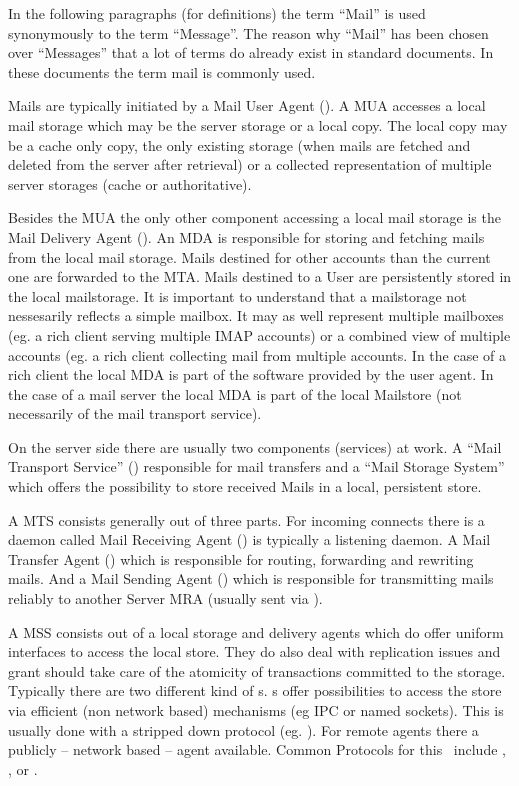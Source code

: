 In the following paragraphs (for definitions) the term ``Mail'' is used synonymously to the term ``Message''. The reason why ``Mail'' has been chosen over ``Messages'' that a lot of terms do already exist in standard documents. In these documents the term mail is commonly used.\par

Mails are typically initiated by a Mail User Agent (). A MUA accesses a local mail storage which may be the server storage or a local copy. The local copy may be a cache only copy, the only existing storage (when mails are fetched and deleted from the server after retrieval) or a collected representation of multiple server storages (cache or authoritative).\par

Besides the MUA the only other component accessing a local mail storage is the Mail Delivery Agent (). An MDA is responsible for storing and fetching mails from the local mail storage. Mails destined for other accounts than the current one are forwarded to the MTA. Mails destined to a User are persistently stored  in the local mailstorage. It is important to understand that a mailstorage not nessesarily reflects a simple mailbox. It may as well represent multiple mailboxes (eg. a rich client serving multiple IMAP accounts) or a combined view of multiple accounts (eg. a rich client collecting mail from multiple  accounts. In the case of a rich client the local MDA is part of the software provided by the user agent. In the case of a mail server the local MDA is part of the local Mailstore (not necessarily of the mail transport service).

On the server side there are usually two components (services) at work. A ``Mail Transport Service'' () responsible for mail transfers and a ``Mail Storage System'' which offers the possibility to store received Mails in a local, persistent store.\par

A MTS consists generally out of three parts. For incoming connects there is a daemon called Mail Receiving Agent () is typically a  listening daemon. A Mail Transfer Agent () which is responsible for routing, forwarding and rewriting mails. And a Mail Sending Agent () which is responsible for transmitting mails reliably to another Server MRA (usually sent via ).\par

A MSS consists out of a local storage and delivery agents which do offer uniform interfaces to access the local store. They do also deal with replication issues and grant should take care of the atomicity of transactions committed to the storage. Typically there are two different kind of s. s offer possibilities to access the store via efficient (non network based) mechanisms (eg IPC or named sockets). This is usually done with a stripped down protocol (eg. ). For remote agents there a publicly -- network based -- agent available. Common Protocols for this \ include , , or .\par

